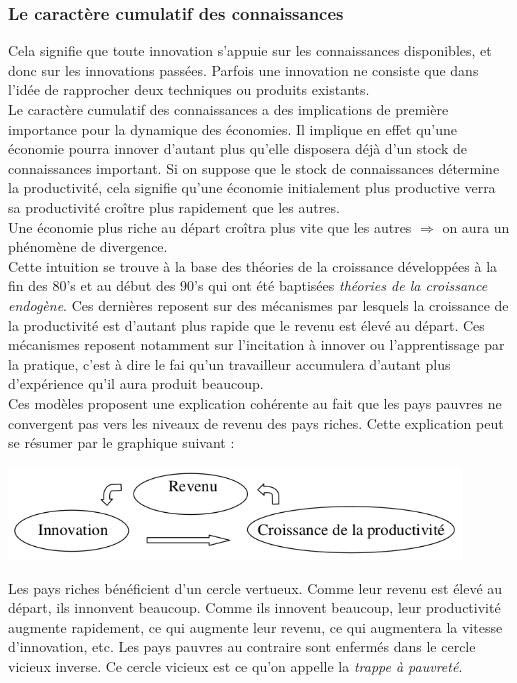 \documentclass[10pt]{book}
\begin{document}
\subsubsection{Le caractère cumulatif des connaissances}
Cela signifie que toute innovation s'appuie sur les connaissances disponibles, et donc sur les innovations passées. Parfois une innovation ne consiste que dans l'idée de rapprocher deux techniques ou produits existants. \\
Le caractère cumulatif des connaissances a des implications de première importance pour la dynamique des économies. Il implique en effet qu'une économie pourra innover d'autant plus qu'elle disposera déjà d'un stock de connaissances important. Si on suppose que le stock de connaissances détermine la productivité, cela signifie qu'une économie initialement plus productive verra sa productivité croître plus rapidement que les autres.\\
Une économie plus riche au départ croîtra plus vite que les autres $\Rightarrow$ on aura un phénomène de divergence. \\
Cette intuition se trouve à la base des théories de la croissance développées à la fin des 80's et au début des 90's qui ont été baptisées \textit{théories de la croissance endogène}. Ces dernières reposent sur des mécanismes par lesquels la croissance de la productivité est d'autant plus rapide que le revenu est élevé au départ. Ces mécanismes reposent notamment sur l'incitation à innover ou l'apprentissage par la pratique, c'est à dire le fai qu'un travailleur accumulera d'autant plus d'expérience qu'il aura produit beaucoup. \\
Ces modèles proposent une explication cohérente au fait que les pays pauvres ne convergent pas vers les niveaux de revenu des pays riches. Cette explication peut se résumer par le graphique suivant :
\begin{center}
  \includegraphics[width=12cm]{graph9.png}
\end{center}
Les pays riches bénéficient d'un cercle vertueux. Comme leur revenu est élevé au départ, ils innonvent beaucoup. Comme ils innovent beaucoup, leur productivité augmente rapidement, ce qui augmente leur revenu, ce qui augmentera la vitesse d'innovation, etc. Les pays pauvres au contraire sont enfermés dans le cercle vicieux inverse. Ce cercle vicieux est ce qu'on appelle la \textit{trappe à pauvreté}.
\end{document}
